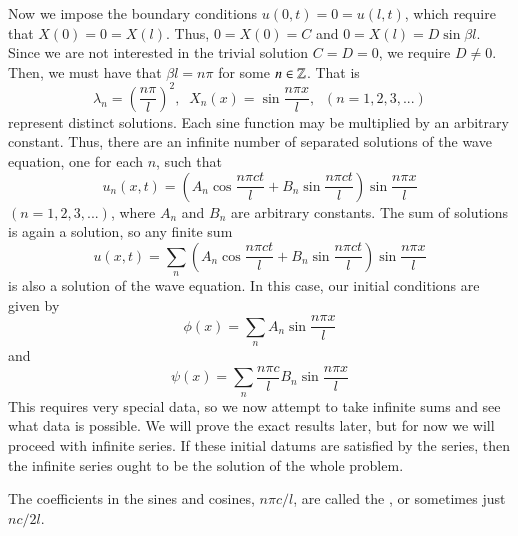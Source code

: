 Now we impose the boundary conditions $u(0,t) = 0 = u(l,t)$, which require that $X(0) = 0 = X(l)$. Thus, $0 = X(0) = C$ and $0 = X(l) = D\sin\beta l$. Since we are not interested in the trivial solution $C=D=0$, we require $D \neq 0$. Then, we must have that $\beta l = n\pi$ for some $n \in \mathbb Z$. That is \begin{equation*}
    \lambda_n = \left(\frac{n\pi}{l}\right)^2,\;\;X_n(x) = \sin\frac{n\pi x}{l}, \;\;(n=1,2,3,...)
\end{equation*}
represent distinct solutions. Each sine function may be multiplied by an arbitrary constant. Thus, there are an infinite number of separated solutions of the wave equation, one for each $n$, such that \begin{equation*}
    u_n(x,t) = \left(A_n\cos\frac{n\pi ct}{l}+B_n\sin\frac{n\pi ct}{l}\right)\sin\frac{n\pi x}{l}
\end{equation*}
$(n=1,2,3,...)$, where $A_n$ and $B_n$ are arbitrary constants. The sum of solutions is again a solution, so any finite sum \begin{equation}
    \boxed{u(x,t) = \sum_{n}\left(A_n\cos\frac{n\pi ct}{l}+B_n\sin\frac{n\pi ct}{l}\right)\sin\frac{n\pi x}{l}}
\end{equation}
is also a solution of the wave equation. In this case, our initial conditions are given by \begin{equation}
    \phi(x) = \sum_nA_n\sin\frac{n\pi x}{l}
\end{equation}
and \begin{equation}
    \psi(x) = \sum_{n}\frac{n\pi c}{l}B_n\sin\frac{n\pi x}{l}
\end{equation}
This requires very special data, so we now attempt to take infinite sums and see what data is possible. We will prove the exact results later, but for now we will proceed with infinite series. If these initial datums are satisfied by the series, then the infinite series ought to be the solution of the whole problem.

The coefficients in the sines and cosines, $n\pi c/l$, are called the , or sometimes just $nc/2l$.


